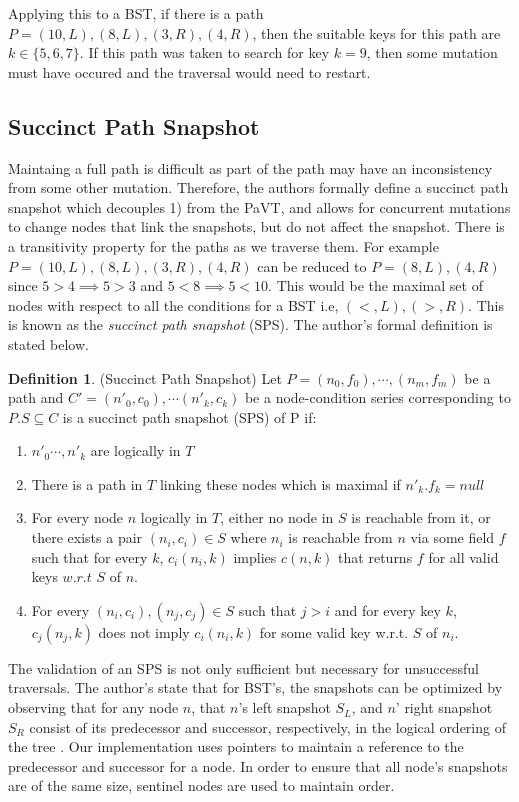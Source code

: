 \documentclass[conference]{IEEEtran}
\theoremstyle{definition}
\newtheorem{definition}{Definition}[section]
\theoremstyle{theorem}
\begin{document}
Applying this to a BST, if there is a path $P=(10,L),(8,L),(3,R),(4,R)$, then the suitable keys for this path are $k\in\{5, 6, 7\}$. If this path was taken to search for key $k=9$, then some mutation must have occured and the traversal would need to restart.   

\subsection{Succinct Path Snapshot}
Maintaing a full path is difficult as part of the path may have an inconsistency from some other mutation. Therefore, the authors formally define a succinct path snapshot which decouples 1) from the PaVT, and allows for concurrent mutations to change nodes that link the snapshots, but do not affect the snapshot. There is a transitivity property for the paths as we traverse them. For example $P=(10,L),(8,L),(3,R),(4,R)$  can be reduced to $P=(8,L),(4,R)$ since $5>4 \implies 5 > 3$  and $5<8 \implies 5<10$. This would be the maximal set of nodes with respect to all the conditions for a BST i.e, $(<,L), (>, R)$. This is known as the \textit{succinct path snapshot} (SPS). The author's formal definition is stated below.
\theoremstyle{definition}
\begin{definition}{(Succinct Path Snapshot)} Let $P = (n_0, f_0),\cdots,(n_m, f_m)$ be a path and $C'=(n'_0, c_0),\cdots (n'_k, c_k)$ be a node-condition series corresponding to $P.S\subseteq C$ is a succinct path snapshot (SPS) of P if:
\begin{enumerate}
	\item $n'_0\cdots, n'_k$ are logically in $T$
	\item There is a path in $T$ linking these nodes which is maximal if $n'_k.f_k = null$
	\item For every node $n$ logically in $T$, either no node in $S$ is reachable from it, or there exists a pair $(n_i, c_i) \in S$ where $n_i$ is reachable from $n$ via some field $f$ such that for every $k$, $c_i(n_i, k)$ implies $c(n, k)$ that returns $f$ for all valid keys $w.r.t$ $S$ of $n$.
	\item For every $(n_i, c_i), (n_j, c_j) \in S$ such that $j > i$ and for every key $k$, $c_j(n_j, k)$ does not imply $c_i(n_i, k)$ for some valid key w.r.t. $S$ of $n_i$.
\end{enumerate}
\end{definition}
The validation of an SPS is not only sufficient but necessary for unsuccessful traversals. The author's state that for BST's, the snapshots can be optimized by observing that for any node $n$, that $n$'s left snapshot $S_L$, and $n$' right snapshot $S_R$ consist of its predecessor and successor, respectively,  in the logical ordering of the tree \cite{draschler-lo}. Our implementation uses pointers to maintain a reference to the predecessor and successor for a node. In order to ensure that all node's snapshots are of the same size, sentinel nodes are used to maintain order.
\end{document}
